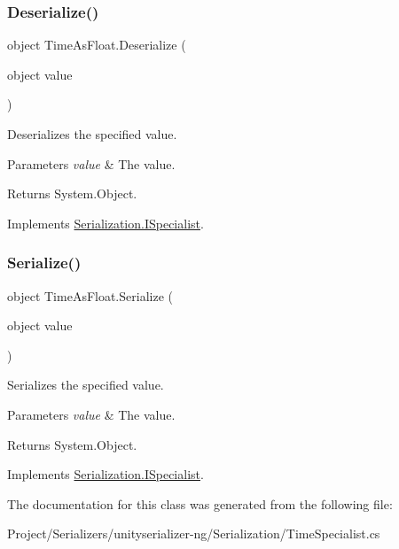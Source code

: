 \subsubsection{\texorpdfstring{Deserialize()}{Deserialize()}}
{\footnotesize\ttfamily object Time\+As\+Float.\+Deserialize (\begin{DoxyParamCaption}\item[{object}]{value }\end{DoxyParamCaption})\hspace{0.3cm}{\ttfamily [inline]}}



Deserializes the specified value. 


\begin{DoxyParams}{Parameters}
{\em value} & The value.\\
\hline
\end{DoxyParams}
\begin{DoxyReturn}{Returns}
System.\+Object.
\end{DoxyReturn}


Implements \hyperlink{interface_serialization_1_1_i_specialist_a90d5a229aacd71121934630932df0f1a}{Serialization.\+I\+Specialist}.

\mbox{\label{class_time_as_float_a2c67f320572b03fa73fbdd206d7fe65f}} 
\subsubsection{\texorpdfstring{Serialize()}{Serialize()}}
{\footnotesize\ttfamily object Time\+As\+Float.\+Serialize (\begin{DoxyParamCaption}\item[{object}]{value }\end{DoxyParamCaption})\hspace{0.3cm}{\ttfamily [inline]}}



Serializes the specified value. 


\begin{DoxyParams}{Parameters}
{\em value} & The value.\\
\hline
\end{DoxyParams}
\begin{DoxyReturn}{Returns}
System.\+Object.
\end{DoxyReturn}


Implements \hyperlink{interface_serialization_1_1_i_specialist_adf11f6ab173de9fe3c26e3cbee292c92}{Serialization.\+I\+Specialist}.



The documentation for this class was generated from the following file\+:\begin{DoxyCompactItemize}
\item 
Project/\+Serializers/unityserializer-\/ng/\+Serialization/Time\+Specialist.\+cs\end{DoxyCompactItemize}
